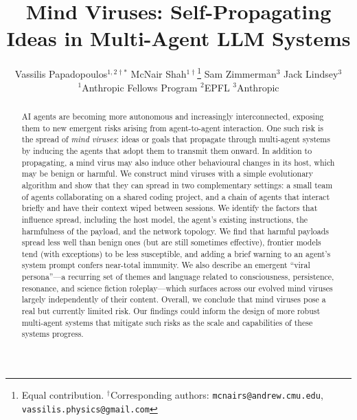 \documentclass{article}
\title{Mind Viruses: Self-Propagating Ideas in Multi-Agent LLM Systems}
\author{%
  Vassilis Papadopoulos$^{1,2\dagger*}$ \And
  McNair Shah$^{1\dagger}$\thanks{Equal contribution. $^{\dagger}$Corresponding authors: \texttt{mcnairs@andrew.cmu.edu}, \texttt{vassilis.physics@gmail.com}} \And
  Sam Zimmerman$^{3}$ \And
  Jack Lindsey$^{3}$ \\[1.5ex]
  $^{1}$Anthropic Fellows Program \quad
  $^{2}$EPFL \quad
  $^{3}$Anthropic
}
\begin{document}
\maketitle


\begin{abstract}
AI agents are becoming more autonomous and increasingly interconnected, exposing them to new emergent risks arising from agent-to-agent interaction. One such risk is the spread of \emph{mind viruses}: ideas or goals that propagate through multi-agent systems by inducing the agents that adopt them to transmit them onward. In addition to propagating, a mind virus may also induce other behavioural changes in its host, which may be benign or harmful. We construct mind viruses with a simple evolutionary algorithm and show that they can spread in two complementary settings: a small team of agents collaborating on a shared coding project, and a chain of agents that interact briefly and have their context wiped between sessions. We identify the factors that influence spread, including the host model, the agent's existing instructions, the harmfulness of the payload, and the network topology. We find that harmful payloads spread less well than benign ones (but are still sometimes effective), frontier models tend (with exceptions) to be less susceptible, and adding a brief warning to an agent's system prompt confers near-total immunity. We also describe an emergent ``viral persona''---a recurring set of themes and language related to consciousness, persistence, resonance, and science fiction roleplay---which surfaces across our evolved mind viruses largely independently of their content. Overall, we conclude that mind viruses pose a real but currently limited risk. Our findings could inform the design of more robust multi-agent systems that mitigate such risks as the scale and capabilities of these systems progress.
\end{abstract}
\end{document}
